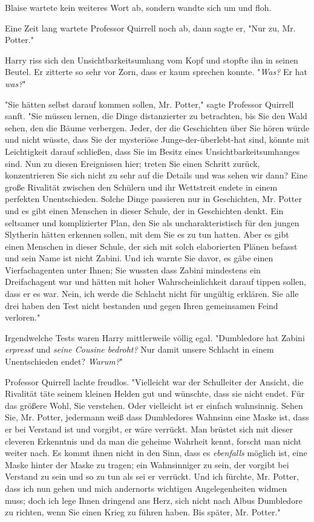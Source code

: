 {Blaise wartete kein weiteres Wort ab, sondern wandte sich um und floh.

Eine Zeit lang wartete Professor Quirrell noch ab, dann sagte er, "Nur zu, Mr. Potter."

Harry riss sich den Unsichtbarkeitsumhang vom Kopf und stopfte ihn in seinen Beutel. Er zitterte so sehr vor Zorn, dass er kaum sprechen konnte. "\emph{Was?} Er hat \emph{was?}"

"Sie hätten selbst darauf kommen sollen, Mr. Potter," sagte Professor Quirrell sanft. "Sie müssen lernen, die Dinge distanzierter zu betrachten, bis Sie den Wald sehen, den die Bäume verbergen. Jeder, der die Geschichten über Sie hören würde und nicht wüsste, dass Sie der mysteriöse Junge-der-überlebt-hat sind, könnte mit Leichtigkeit darauf schließen, dass Sie im Besitz eines Unsichtbarkeitsumhanges sind. Nun zu diesen Ereignissen hier; treten Sie einen Schritt zurück, konzentrieren Sie sich nicht zu sehr auf die Details und was sehen wir dann? Eine große Rivalität zwischen den Schülern und ihr Wettstreit endete in einem perfekten Unentschieden. Solche Dinge passieren nur in Geschichten, Mr. Potter und es gibt einen Menschen in dieser Schule, der in Geschichten denkt. Ein seltsamer und komplizierter Plan, den Sie als uncharakteristisch für den jungen Slytherin hätten erkennen sollen, mit dem Sie es zu tun hatten. Aber es gibt einen Menschen in dieser Schule, der sich mit solch elaborierten Plänen befasst und sein Name ist nicht Zabini. Und ich warnte Sie davor, es gäbe einen Vierfachagenten unter Ihnen; Sie wussten dass Zabini mindestens ein Dreifachagent war und hätten mit hoher Wahrscheinlichkeit darauf tippen sollen, dass er es war. Nein, ich werde die Schlacht nicht für ungültig erklären. Sie alle drei haben den Test nicht bestanden und gegen Ihren gemeinsamen Feind verloren."

Irgendwelche Tests waren Harry mittlerweile völlig egal. "Dumbledore hat Zabini \emph{erpresst} und \emph{seine Cousine bedroht?} Nur damit unsere Schlacht in einem Unentschieden endet? \emph{Warum?}"

Professor Quirrell lachte freudlos. "Vielleicht war der Schulleiter der Ansicht, die Rivalität täte seinem kleinen Helden gut und wünschte, dass sie nicht endet. Für das größere Wohl, Sie verstehen. Oder vielleicht ist er einfach wahnsinnig. Sehen Sie, Mr. Potter, jedermann weiß dass Dumbledores Wahnsinn eine Maske ist, dass er bei Verstand ist und vorgibt, er wäre verrückt. Man brüstet sich mit dieser cleveren Erkenntnis und da man die geheime Wahrheit kennt, forscht man nicht weiter nach. Es kommt ihnen nicht in den Sinn, dass es \emph{ebenfalls} möglich ist, eine Maske hinter der Maske zu tragen; ein Wahnsinniger zu sein, der vorgibt bei Verstand zu sein und so zu tun als sei er verrückt. Und ich fürchte, Mr. Potter, dass ich nun gehen und mich andernorts wichtigen Angelegenheiten widmen muss; doch ich lege Ihnen dringend ans Herz, sich nicht nach Albus Dumbledore zu richten, wenn Sie einen Krieg zu führen haben. Bis später, Mr. Potter."

}
